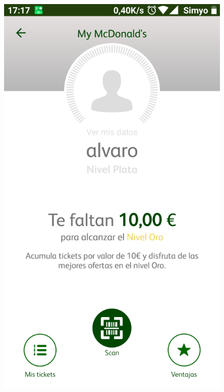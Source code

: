 \documentclass[twoside]{report}
\begin{document}
\begin{figure}[H]
\begin{center}
\includegraphics[scale=0.25]{images/restaurantes/mcdo1.png}

\end{center}
\end{figure}
\end{document}
